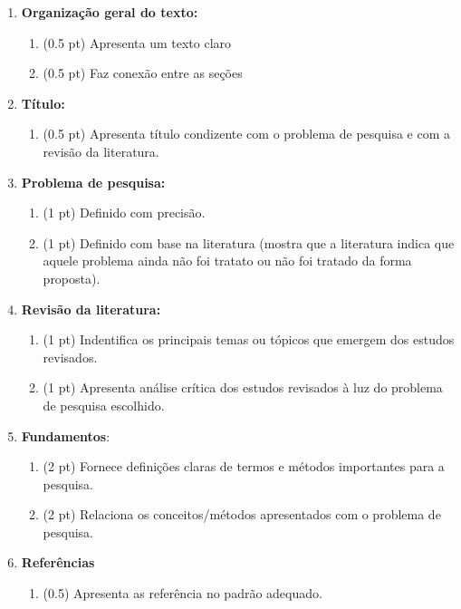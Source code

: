 \documentclass[12pt,a4paper, brazil]{article}
\begin{document}
\begin{enumerate}
    \item \textbf{Organização geral do texto:}
        \begin{enumerate}
            \item (0.5 pt) Apresenta um texto claro
            \item (0.5 pt) Faz conexão entre as seções
        \end{enumerate}
    \item \textbf{Título:} 
    \begin{enumerate}
        \item (0.5 pt) Apresenta título condizente com o problema de pesquisa e com a revisão da literatura.
    \end{enumerate}
    \item \textbf{Problema de pesquisa:} 
        \begin{enumerate}
            \item (1 pt) Definido com precisão.
            \item (1 pt) Definido com base na literatura (mostra que a literatura indica que aquele problema ainda não foi tratato ou não foi tratado da forma proposta). 
        \end{enumerate}
    \item \textbf{Revisão da literatura:} 
        \begin{enumerate}
            \item (1 pt) Indentifica os principais temas ou tópicos que emergem dos estudos revisados.
            \item (1 pt) Apresenta análise crítica dos estudos revisados à luz do problema de pesquisa escolhido.
        \end{enumerate}
    \item \textbf{Fundamentos}:
        \begin{enumerate}
            \item (2 pt) Fornece definições claras de termos e métodos importantes para a pesquisa.
            \item (2 pt) Relaciona os conceitos/métodos apresentados com o problema de pesquisa.  
        \end{enumerate}
    \item \textbf{Referências}
        \begin{enumerate}
            \item (0.5) Apresenta as referência no padrão adequado. 
        \end{enumerate}
\end{enumerate}
\end{document}
